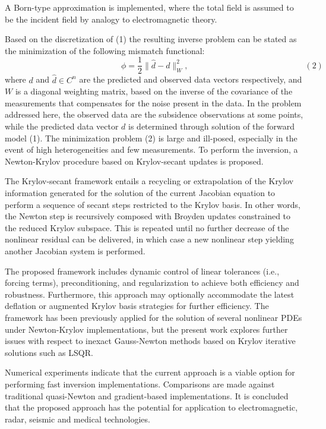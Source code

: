 \documentclass{report}
\begin{document}
A Born-type approximation is implemented, where the
total field is assumed to be the incident field by
analogy to electromagnetic theory.

Based on the discretization of
(1) the resulting inverse problem can be stated as
the minimization of the following mismatch functional:
$$
\qquad
\qquad
\qquad
\qquad
\qquad
\qquad
\qquad
\phi =\frac{1}{2} \|\hat{d}-d\|_W^2,
\qquad
\qquad
\qquad
\qquad
\qquad
\qquad
\qquad
(2)
$$
where $d$ and $\hat{d}\in C^n$
are the predicted and observed data vectors
respectively, and $W$ is a diagonal weighting matrix, based
on the inverse of the covariance of the measurements that
compensates for the noise present in the data. In the
problem addressed here, the observed data are the subsidence
observations at some points, while the predicted data vector
$d$ is determined through solution of the forward model
(1).
The minimization problem (2) is large
and ill-posed, especially in the event of high
heterogeneities and few measurements. To perform the
inversion, a Newton-Krylov procedure based on
Krylov-secant updates is proposed.

The Krylov-secant framework entails
a recycling or extrapolation of the Krylov information
generated for the solution of the current Jacobian equation
to perform a sequence of secant steps restricted to the
Krylov basis. In other words, the Newton step is recursively
composed with Broyden updates constrained to the reduced
Krylov subspace. This is repeated until no further decrease
of the nonlinear residual can be delivered, in which case a
new nonlinear step yielding another Jacobian system is
performed.

The proposed framework includes dynamic
control of linear tolerances (i.e., forcing terms),
preconditioning, and regularization to achieve both
efficiency and robustness. Furthermore, this approach may
optionally accommodate the latest deflation or augmented
Krylov basis strategies for further efficiency. The
framework has been previously applied for the solution of
several nonlinear PDEs under Newton-Krylov implementations,
but the present work explores further issues with respect to
inexact Gauss-Newton methods based on Krylov iterative
solutions such as LSQR.

Numerical experiments indicate
that the current approach is a viable option for performing
fast inversion implementations. Comparisons are made against
traditional quasi-Newton and gradient-based implementations.
It is concluded that the proposed approach has the potential
for application to electromagnetic, radar, seismic and
medical technologies.



\end{document}
